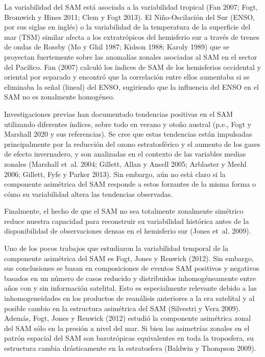 \documentclass[12pt,oneside,a4paper]{reedthesis}
\begin{document}
La variabilidad del SAM está asociada a la variabilidad tropical (Fan 2007; Fogt, Bromwich y Hines 2011; Clem y Fogt 2013).
El Niño-Oscilación del Sur (ENSO, por sus siglas en inglés) o la variabilidad de la temperatura de la superficie del mar (TSM) similar afecta a los extratrópicos del hemisferio sur a través de trenes de ondas de Rossby (Mo y Ghil 1987; Kidson 1988; Karoly 1989) que se proyectan fuertemente sobre las anomalías zonales asociadas al SAM en el sector del Pacífico.
Fan (2007) calculó los índices de SAM de los hemisferios occidental y oriental por separado y encontró que la correlación entre ellos aumentaba si se eliminaba la señal (lineal) del ENSO, sugiriendo que la influencia del ENSO en el SAM no es zonalmente homogéneo.

Investigaciones previas han documentado tendencias positivas en el SAM utilizando diferentes índices, sobre todo en verano y otoño austral (p.e., Fogt y Marshall 2020 y sus referencias).
Se cree que estas tendencias están impulsadas principalmente por la reducción del ozono estratosférico y el aumento de los gases de efecto invernadero, y son analizadas en el contexto de las variables medias zonales (Marshall et~al. 2004; Gillett, Allan y Ansell 2005; Arblaster y Meehl 2006; Gillett, Fyfe y Parker 2013).
Sin embargo, aún no está claro si la componente asimétrica del SAM responde a estos forzantes de la misma forma o cómo su variabilidad altera las tendencias observadas.

Finalmente, el hecho de que el SAM no sea totalmente zonalmente simétrico reduce nuestra capacidad para reconstruir su variabilidad histórica antes de la disponibilidad de observaciones densas en el hemisferio sur (Jones et~al. 2009).

Uno de los pocos trabajos que estudiaron la variabilidad temporal de la componente asimétrica del SAM es Fogt, Jones y Renwick (2012).
Sin embargo, sus conclusiones se basan en composiciones de eventos SAM positivos y negativos basados en un número de casos reducido y distribuidos inhomogéneamente entre años con y sin información satelital.
Esto es especialmente relevante debido a las inhomogeneidades en los productos de reanálisis anteriores a la era satelital y al posible cambio en la estructura asimétrica del SAM (Silvestri y Vera 2009).
Además, Fogt, Jones y Renwick (2012) estudió la componente asimétrica zonal del SAM sólo en la presión a nivel del mar.
Si bien las asimetrías zonales en el patrón espacial del SAM son barotrópicas equivalentes en toda la troposfera, su estructura cambia drásticamente en la estratosfera (Baldwin y Thompson 2009).
\end{document}
